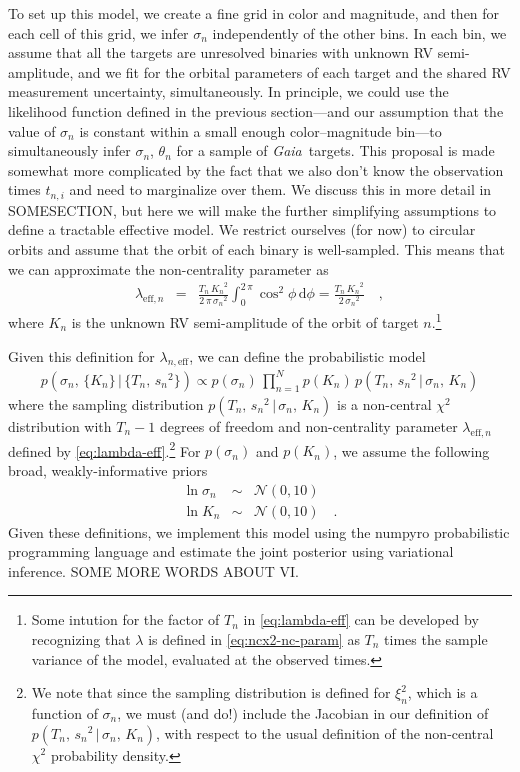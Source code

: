 \documentclass[modern, letterpaper]{aastex631}
\newcommand{\package}[1]{\textsf{#1}}
\newcommand{\project}[1]{\textsl{#1}}
\newcommand{\Gaia}{\project{Gaia}}
\newcommand{\dd}{\ensuremath{\,\mathrm{d}}}
\begin{document}
To set up this model, we create a fine grid in color and magnitude, and then for each cell of this grid, we infer $\sigma_n$ independently of the other bins.
In each bin, we assume that all the targets are unresolved binaries with unknown RV semi-amplitude, and we fit for the orbital parameters of each target and the shared RV measurement uncertainty, simultaneously.
In principle, we could use the likelihood function defined in the previous section---and our assumption that the value of $\sigma_n$ is constant within a small enough color--magnitude bin---to simultaneously infer $\sigma_n$, $\theta_n$ for a sample of \Gaia\ targets.
This proposal is made somewhat more complicated by the fact that we also don't know the observation times $t_{n,i}$ and need to marginalize over them.
We discuss this in more detail in SOMESECTION, but here we will make the further simplifying assumptions to define a tractable effective model.
We restrict ourselves (for now) to circular orbits and assume that the orbit of each binary is well-sampled.
This means that we can approximate the non-centrality parameter as
\begin{eqnarray}
	\lambda_{\mathrm{eff},n} &=& \frac{T_n\,{K_n}^2}{2\,\pi\,{\sigma_n}^2}\int_{0}^{2\,\pi} \cos^2\phi \dd\phi = \frac{T_n\,{K_n}^2}{2\,{\sigma_n}^2} \quad,
	\label{eq:lambda-eff}
\end{eqnarray}
where $K_n$ is the unknown RV semi-amplitude of the orbit of target $n$.\footnote{Some intution for the factor of $T_n$ in \autoref{eq:lambda-eff} can be developed by recognizing that $\lambda$ is defined in \ref{eq:ncx2-nc-param} as $T_n$ times the sample variance of the model, evaluated at the observed times.}

Given this definition for $\lambda_{n,\mathrm{eff}}$, we can define the probabilistic model
\begin{eqnarray}
	p(\sigma_n,\,\{K_n\}\,|\,\{T_n,\,{s_n}^2\}) \propto
	p(\sigma_n)\,\prod_{n=1}^{N} p(K_n)\,p(T_n,\,{s_n}^2\,|\,\sigma_n,\,K_n)
\end{eqnarray}
where the sampling distribution $p(T_n,\,{s_n}^2\,|\,\sigma_n,\,K_n)$ is a non-central $\chi^2$ distribution with $T_n - 1$ degrees of freedom and non-centrality parameter $\lambda_{\mathrm{eff},n}$ defined by \autoref{eq:lambda-eff}.\footnote{We note that since the sampling distribution is defined for $\xi_n^2$, which is a function of $\sigma_n$, we must (and do!) include the Jacobian in our definition of $p(T_n,\,{s_n}^2\,|\,\sigma_n,\,K_n)$, with respect to the usual definition of the non-central $\chi^2$ probability density.}
For $p(\sigma_n)$ and $p(K_n)$, we assume the following broad, weakly-informative priors
\begin{eqnarray}
	\ln \sigma_n &\sim& \mathcal{N}(0, 10) \nonumber\\
	\ln K_n &\sim& \mathcal{N}(0, 10) \quad.
\end{eqnarray}
Given these definitions, we implement this model using the \package{numpyro} probabilistic programming language and estimate the joint posterior using variational inference.
SOME MORE WORDS ABOUT VI.
\end{document}
